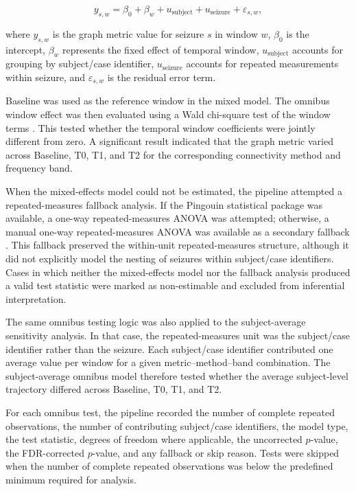 \[
    y_{s,w}
    =
    \beta_0
    +
    \beta_w
    +
    u_{\mathrm{subject}}
    +
    u_{\mathrm{seizure}}
    +
    \varepsilon_{s,w},
\]

where $y_{s,w}$ is the graph metric value for seizure $s$ in window $w$,
$\beta_0$ is the intercept, $\beta_w$ represents the fixed effect of temporal
window, $u_{\mathrm{subject}}$ accounts for grouping by subject/case identifier,
$u_{\mathrm{seizure}}$ accounts for repeated measurements within seizure, and
$\varepsilon_{s,w}$ is the residual error term.

Baseline was used as the reference window in the mixed model. The omnibus
window effect was then evaluated using a Wald chi-square test of the window
terms \cite{Wald1943}. This tested whether the temporal window coefficients were jointly
different from zero. A significant result indicated that the graph metric
varied across Baseline, T0, T1, and T2 for the corresponding connectivity
method and frequency band.

When the mixed-effects model could not be estimated, the pipeline attempted a
repeated-measures fallback analysis. If the Pingouin statistical package was
available, a one-way repeated-measures ANOVA was attempted; otherwise, a manual
one-way repeated-measures ANOVA was available as a secondary fallback
\cite{Girden1992,Vallat2018}. This fallback preserved the within-unit
repeated-measures structure, although it did not explicitly model the nesting
of seizures within subject/case identifiers. Cases in which neither the
mixed-effects model nor the fallback analysis produced a valid test statistic
were marked as non-estimable and excluded from inferential interpretation.

The same omnibus testing logic was also applied to the subject-average
sensitivity analysis. In that case, the repeated-measures unit was the
subject/case identifier rather than the seizure. Each subject/case identifier
contributed one average value per window for a given metric--method--band
combination. The subject-average omnibus model therefore tested whether the
average subject-level trajectory differed across Baseline, T0, T1, and T2.

For each omnibus test, the pipeline recorded the number of complete repeated
observations, the number of contributing subject/case identifiers, the model
type, the test statistic, degrees of freedom where applicable, the uncorrected
$p$-value, the FDR-corrected $p$-value, and any fallback or skip reason. Tests
were skipped when the number of complete repeated observations was below the
predefined minimum required for analysis.

